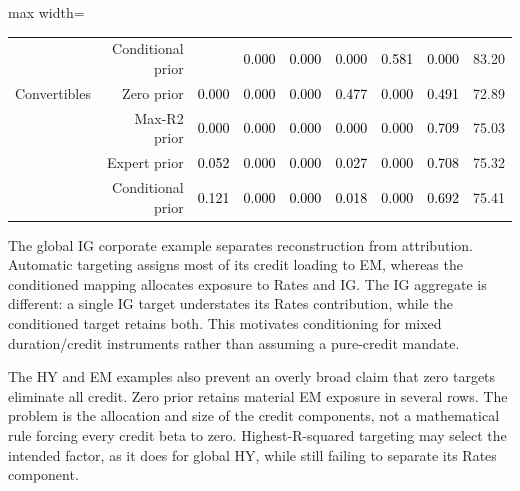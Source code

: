 \documentclass[a4paper,review]{cas-sc}
\begin{document}
\begin{table}[pos=htbp]
\begin{adjustbox}{max width=\linewidth}
\begin{tabular}{lrrrrrrrr}
 & Conditional prior & \cellcolor[HTML]{C6413E}\textcolor{white}{1.030} & \cellcolor[HTML]{FFFFFF}\textcolor{black}{0.000} & \cellcolor[HTML]{FFFFFF}\textcolor{black}{0.000} & \cellcolor[HTML]{FFFFFF}\textcolor{black}{0.000} & \cellcolor[HTML]{F5A886}\textcolor{black}{0.581} & \cellcolor[HTML]{FFFFFF}\textcolor{black}{0.000} & 83.20 \\
Convertibles & Zero prior & \cellcolor[HTML]{FFFFFF}\textcolor{black}{0.000} & \cellcolor[HTML]{FFFFFF}\textcolor{black}{0.000} & \cellcolor[HTML]{FFFFFF}\textcolor{black}{0.000} & \cellcolor[HTML]{F8BB9E}\textcolor{black}{0.477} & \cellcolor[HTML]{FFFFFF}\textcolor{black}{0.000} & \cellcolor[HTML]{F7B99C}\textcolor{black}{0.491} & 72.89 \\
 & Max-R2 prior & \cellcolor[HTML]{FFFFFF}\textcolor{black}{0.000} & \cellcolor[HTML]{FFFFFF}\textcolor{black}{0.000} & \cellcolor[HTML]{FFFFFF}\textcolor{black}{0.000} & \cellcolor[HTML]{FFFFFF}\textcolor{black}{0.000} & \cellcolor[HTML]{FFFFFF}\textcolor{black}{0.000} & \cellcolor[HTML]{E98B6E}\textcolor{black}{0.709} & 75.03 \\
 & Expert prior & \cellcolor[HTML]{F8F2EF}\textcolor{black}{0.052} & \cellcolor[HTML]{FFFFFF}\textcolor{black}{0.000} & \cellcolor[HTML]{FFFFFF}\textcolor{black}{0.000} & \cellcolor[HTML]{F8F4F2}\textcolor{black}{0.027} & \cellcolor[HTML]{FFFFFF}\textcolor{black}{0.000} & \cellcolor[HTML]{E98B6E}\textcolor{black}{0.708} & 75.32 \\
 & Conditional prior & \cellcolor[HTML]{F9EBE3}\textcolor{black}{0.121} & \cellcolor[HTML]{FFFFFF}\textcolor{black}{0.000} & \cellcolor[HTML]{FFFFFF}\textcolor{black}{0.000} & \cellcolor[HTML]{F7F5F4}\textcolor{black}{0.018} & \cellcolor[HTML]{FFFFFF}\textcolor{black}{0.000} & \cellcolor[HTML]{EA8E70}\textcolor{black}{0.692} & 75.41 \\
\bottomrule
\end{tabular}
\end{adjustbox}
\end{table}

The global IG corporate example separates reconstruction from attribution. Automatic targeting assigns most of its credit loading to EM, whereas the conditioned mapping allocates exposure to Rates and IG. The IG aggregate is different: a single IG target understates its Rates contribution, while the conditioned target retains both. This motivates conditioning for mixed duration/credit instruments rather than assuming a pure-credit mandate.

The HY and EM examples also prevent an overly broad claim that zero targets eliminate all credit. Zero prior retains material EM exposure in several rows. The problem is the allocation and size of the credit components, not a mathematical rule forcing every credit beta to zero. Highest-R-squared targeting may select the intended factor, as it does for global HY, while still failing to separate its Rates component.
\end{document}
